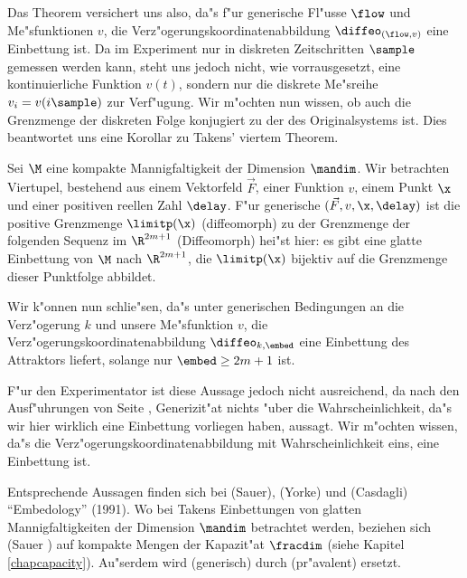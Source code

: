 Das Theorem versichert uns also, da"s f"ur generische Fl"usse $\flow$ und
Me"sfunktionen $v$, die Verz"ogerungskoordinatenabbildung $\diffeo_{(\flow,v)}$ eine
Einbettung ist. Da im Experiment nur in diskreten Zeitschritten $\sample$ gemessen werden
kann, steht uns jedoch nicht, wie vorrausgesetzt, eine kontinuierliche Funktion $v(t)$,
sondern nur die diskrete Me"sreihe $v_i=v(i\sample)$ zur Verf"ugung. Wir m"ochten nun
wissen, ob auch die Grenzmenge der diskreten Folge konjugiert zu der des Originalsystems
ist. Dies beantwortet uns eine Korollar zu Takens' viertem Theorem.
\begin{corollar}
Sei $\M$ eine kompakte Mannigfaltigkeit der Dimension $\mandim$. Wir betrachten Viertupel,
bestehend aus einem Vektorfeld $\vec F$, einer Funktion $v$, einem Punkt $\x$ und einer
positiven reellen Zahl $\delay$. F"ur generische $(\vec F, v, \x, \delay)$ ist die
positive Grenzmenge $\limitp(\x)$ \naja(diffeomorph) zu der Grenzmenge der folgenden
Sequenz im $\R^{2m+1}$
\naja(Diffeomorph) hei"st hier: es gibt eine glatte Einbettung von $\M$ nach $\R^{2m+1}$,
die $\limitp(\x)$ bijektiv auf die Grenzmenge dieser Punktfolge abbildet.
\end{corollar}

Wir k"onnen nun schlie"sen, da"s unter generischen Bedingungen an die Verz"ogerung $k$ und unsere
Me"sfunktion $v$, die Verz"ogerungskoordinatenabbildung $\diffeo_{k,\embed}$ eine Einbettung
des Attraktors liefert, solange nur $\embed\geq2m+1$ ist. 

F"ur den Experimentator ist diese Aussage jedoch nicht ausreichend, da nach den Ausf"uh\-rungen von
Seite \pageref{generisch}, Generizit"at nichts "uber die Wahrscheinlichkeit, da"s wir hier wirklich eine Einbettung
vorliegen haben, aussagt. Wir m"ochten wissen, da"s die Verz"ogerungskoordinatenabbildung  mit
Wahrscheinlichkeit eins, eine Einbettung ist. 


Entsprechende Aussagen finden sich bei \autor(Sauer), \autor(Yorke) und \autor(Casdagli)
``Embedology'' (1991). Wo bei Takens Einbettungen von glatten Mannigfaltigkeiten der
Dimension $\mandim$ betrachtet werden, beziehen sich \autor(Sauer \etal) auf kompakte Mengen der
Kapazit"at $\fracdim$ (siehe Kapitel \ref{chapcapacity}). Au"serdem wird \begriff(generisch)
durch \begriff(pr"avalent) ersetzt.



